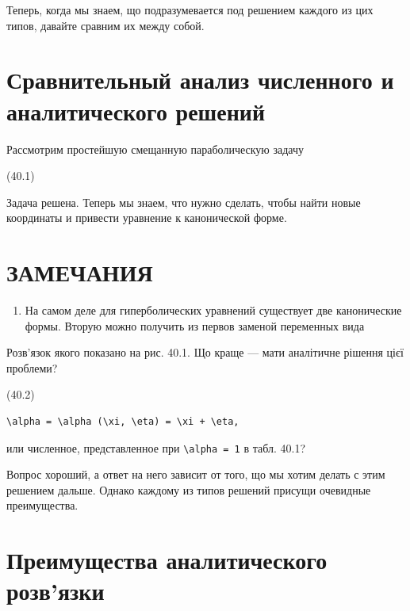 \documentclass[
  ukrainian,
]{article}
\providecommand{\tightlist}{%
  \setlength{\itemsep}{0pt}\setlength{\parskip}{0pt}}
\begin{document}
Теперь, когда мы знаем, що подразумевается под решением каждого из цих
типов, давайте сравним их между собой.

\section{\texorpdfstring{\textbf{Сравнительный анализ численного} и
аналитического
решений}{Сравнительный анализ численного и аналитического решений}}\label{ux441ux440ux430ux432ux43dux438ux442ux435ux43bux44cux43dux44bux439-ux430ux43dux430ux43bux438ux437-ux447ux438ux441ux43bux435ux43dux43dux43eux433ux43e-ux438-ux430ux43dux430ux43bux438ux442ux438ux447ux435ux441ux43aux43eux433ux43e-ux440ux435ux448ux435ux43dux438ux439}

Рассмотрим простейшую смещанную параболическую задачу

(40.1)

Задача решена. Теперь мы знаем, что нужно сделать, чтобы найти новые
координаты и привести уравнение к канонической форме.

\section{ЗАМЕЧАНИЯ}\label{ux437ux430ux43cux435ux447ux430ux43dux438ux44f}

\begin{enumerate}
\def\labelenumi{\arabic{enumi}.}
\tightlist
\item
  На самом деле для гиперболических уравнений существует две
  канонические формы. Вторую можно получить из первов заменой переменных
  вида
\end{enumerate}

Розв'язок якого показано на рис. 40.1. Що краще --- мати аналітичне
рішення цієї проблеми?

(40.2)

\begin{verbatim}
\alpha = \alpha (\xi, \eta) = \xi + \eta,
\end{verbatim}

или численное, представленное при \texttt{\textbackslash{}alpha\ =\ 1} в
табл. 40.1?

Вопрос хороший, а ответ на него зависит от того, що мы хотим делать с
этим решением дальше. Однако каждому из типов решений присущи очевидные
преимущества.

\section{Преимущества аналитического
розв'язки}\label{ux43fux440ux435ux438ux43cux443ux449ux435ux441ux442ux432ux430-ux430ux43dux430ux43bux438ux442ux438ux447ux435ux441ux43aux43eux433ux43e-ux440ux43eux437ux432ux44fux437ux43aux438}
\end{document}
